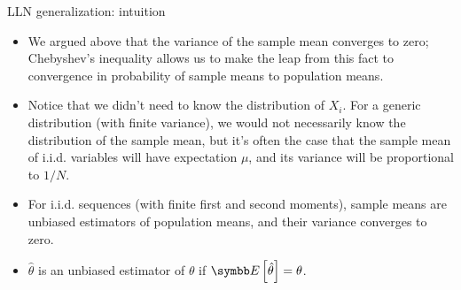 \documentclass[aspectratio=169,11pt]{beamer}
\begin{document}
\begin{frame}{LLN generalization: intuition}
\begin{itemize}
	 \item We argued above that the variance of the sample mean converges to zero;
			Chebyshev's inequality allows us to make the leap from this fact to convergence in probability
			of sample means to population means. 


	\item Notice that we didn't need to know the distribution of $X_i$. For a generic distribution (with finite variance), we would not necessarily know the distribution of the sample mean, but it's often the case that the sample mean of i.i.d. variables will have expectation $\mu$, and its variance
	will be proportional to $1/N$.
			

	\medskip
	\item For i.i.d. sequences (with finite first and second moments), sample means are unbiased estimators of population means, and their variance converges to zero.

	\item $\hat{\theta}$ is an \alert{unbiased} estimator of $\theta$ if $\E\left[\hat{\theta}\right] = \theta$.
\end{itemize}
\end{frame}




	
	
	
	
\end{document}
